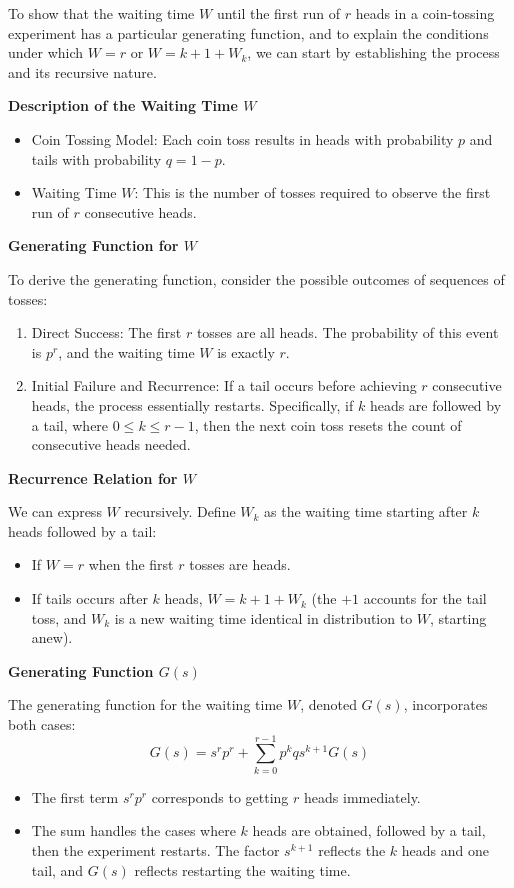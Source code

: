 \documentclass[8pt]{article}
\begin{document}
To show that the waiting time \( W \) until the first run of \( r \) heads in a coin-tossing experiment has a particular generating function, and to explain the conditions under which \( W = r \) or \( W = k + 1 + W_k \), we can start by establishing the process and its recursive nature.

\textbf{Description of the Waiting Time \( W \)}

\begin{itemize}
    \item Coin Tossing Model: Each coin toss results in heads with probability \( p \) and tails with probability \( q = 1-p \).
    \item Waiting Time \( W \): This is the number of tosses required to observe the first run of \( r \) consecutive heads.
\end{itemize}

\textbf{Generating Function for \( W \)}

To derive the generating function, consider the possible outcomes of sequences of tosses:
\begin{enumerate}
    \item Direct Success: The first \( r \) tosses are all heads. The probability of this event is \( p^r \), and the waiting time \( W \) is exactly \( r \).
    \item Initial Failure and Recurrence: If a tail occurs before achieving \( r \) consecutive heads, the process essentially restarts. Specifically, if \( k \) heads are followed by a tail, where \( 0 \leq k \leq r-1 \), then the next coin toss resets the count of consecutive heads needed.
\end{enumerate}

\textbf{Recurrence Relation for \( W \)}

We can express \( W \) recursively. Define \( W_k \) as the waiting time starting after \( k \) heads followed by a tail:
\begin{itemize}
    \item If \( W = r \) when the first \( r \) tosses are heads.
    \item If tails occurs after \( k \) heads, \( W = k + 1 + W_k \) (the \( +1 \) accounts for the tail toss, and \( W_k \) is a new waiting time identical in distribution to \( W \), starting anew).
\end{itemize}

\textbf{Generating Function \( G(s) \)}

The generating function for the waiting time \( W \), denoted \( G(s) \), incorporates both cases:
\[ G(s) = s^r p^r + \sum_{k=0}^{r-1} p^k q s^{k+1} G(s) \]
\begin{itemize}
    \item The first term \( s^r p^r \) corresponds to getting \( r \) heads immediately.
    \item The sum handles the cases where \( k \) heads are obtained, followed by a tail, then the experiment restarts. The factor \( s^{k+1} \) reflects the \( k \) heads and one tail, and \( G(s) \) reflects restarting the waiting time.
\end{itemize}
\end{document}
